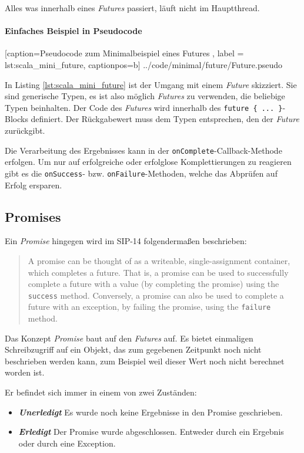 Alles was innerhalb eines \emph{Futures} passiert, läuft nicht im
Hauptthread.

\paragraph{Einfaches Beispiel in Pseudocode}


    [caption={Pseudocode zum Minimalbeispiel eines Futures },
       label = lst:scala_mini_future,
       captionpos=b]
 {../code/minimal/future/Future.pseudo}
 
In Listing \ref{lst:scala_mini_future} ist der Umgang mit einem \emph{Future}
skizziert. Sie sind generische Typen, es ist also möglich \emph{Futures}
zu verwenden, die beliebige Typen beinhalten. Der Code des \emph{Futures}
wird innerhalb des \texttt{future \{ ... \}}-Blocks definiert. Der
Rückgabewert muss dem Typen entsprechen, den der \emph{Future} zurückgibt.

Die Verarbeitung des Ergebnisses kann in der \texttt{onComplete}-Callback-Methode 
erfolgen. Um nur auf erfolgreiche oder erfolglose Komplettierungen
zu reagieren gibt es die \texttt{onSuccess}- bzw. \texttt{onFailure}-Methoden,
welche das Abprüfen auf Erfolg ersparen.

\subsection{Promises}

Ein \emph{Promise} hingegen wird im SIP-14 folgendermaßen beschrieben:
\begin{quote}
A promise can be thought of as a writeable, single-assignment container, which 
completes a future. That is, a promise can be used to successfully complete a 
future with a value (by \glqq completing\grqq{} the promise) using the \texttt{success} method. 
Conversely, a promise can also be used to complete a future with an exception, 
by failing the promise, using the \texttt{failure} method.
\end{quote}

Das Konzept \emph{Promise} baut auf den \emph{Futures} auf. Es bietet
einmaligen Schreibzugriff auf ein Objekt, das zum gegebenen Zeitpunkt
noch nicht beschrieben werden kann, zum Beispiel weil dieser Wert
noch nicht berechnet worden ist.

Er befindet sich immer in einem von zwei Zuständen:
\begin{itemize}
 \item{\textbf{\emph{Unerledigt}} Es wurde noch keine Ergebnisse in den Promise geschrieben.}
 \item{\textbf{\emph{Erledigt}} Der Promise wurde abgeschlossen. Entweder durch ein Ergebnis oder durch eine Exception.}
\end{itemize}

